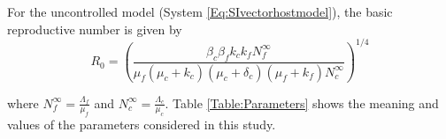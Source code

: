 \documentclass[preprint,12pt]{elsarticle}
\begin{document}
\noindent For the uncontrolled model (System \ref{Eq:SIvectorhostmodel}), the basic reproductive number is given by
  \begin{equation}\label{eq:R0}
     R_0=\left(\frac{\beta_c\beta_f k_c k_fN_f^{\infty}}{\mu_f(\mu_c+k_c)(\mu_c+\delta_c)(\mu_f+k_f)N_c^{\infty}} \right)^{1/4}
 \end{equation}

\noindent where $
    \displaystyle
    N_f^{\infty}=\frac{\Lambda_f}{\mu_f}
    $
 and
$
    \displaystyle
    N_c^{\infty} = \frac{\Lambda_c}{\mu_c}
$. Table \ref{Table:Parameters} shows
 the meaning and values of the parameters considered in this study.


\end{document}
